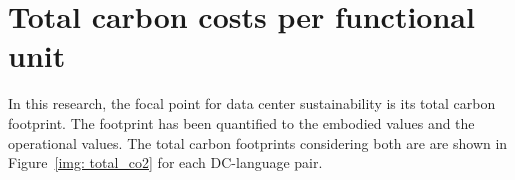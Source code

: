     
    
    

    
    
    
    \section{Total carbon costs per functional unit}

    In this research, the focal point for data center sustainability is its total carbon footprint. The footprint has been quantified to the embodied values and the operational values. The total carbon footprints considering both are are shown in Figure~\ref{img: total_co2} for each DC-language pair.  
    
    
    
    
    
    
    

